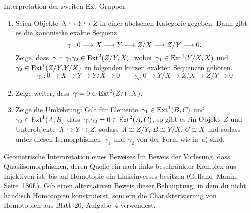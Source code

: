 \documentclass{uebblatt}
\begin{document}
\begin{aufgabe}{Interpretation der zweiten Ext-Gruppen}
\begin{enumerate}
\item Seien Objekte~$X \hookrightarrow Y \hookrightarrow Z$ in einer abelschen
Kategorie gegeben. Dann gibt es die kanonische exakte Sequenz
\[ \gamma : 0 \longrightarrow X \longrightarrow Y \longrightarrow Z/X \longrightarrow Z/Y \longrightarrow 0. \]
Zeige, dass~$\gamma = \gamma_1 \gamma_2 \in \mathrm{Ext}^2(Z/Y,X)$, wobei~$\gamma_1 \in
\mathrm{Ext}^1(Y/X,X)$ und $\gamma_2 \in \mathrm{Ext}^1(Z/Y,Y/X)$ zu folgenden kurzen exakten
Sequenzen gehören.
\[ \gamma_1 : 0 \to X \to Y \to Y/X \to 0 \qquad
  \gamma_2 : 0 \to Y/X \to Z/X \to Z/Y \to 0 \]
\item Zeige weiter, dass~$\gamma = 0 \in \mathrm{Ext}^2(Z/Y,X)$.
\item Zeige die Umkehrung: Gilt für Elemente~$\gamma_1 \in \mathrm{Ext}^1(B,C)$ und
$\gamma_2 \in \mathrm{Ext}^1(A,B)$ dass~$\gamma_1 \gamma_2 = 0 \in \mathrm{Ext}^2(A,C)$, so
gibt es ein Objekt~$Z$ und Unterobjekte~$X \hookrightarrow Y \hookrightarrow
Z$, sodass~$A \cong Z/Y$, $B \cong Y/X$, $C \cong X$ und sodass unter diesen
Isomorphismen~$\gamma_1$ und~$\gamma_2$ von der Form wie in~a) sind.
\end{enumerate}
\end{aufgabe}

\newpage

\begin{aufgabe}{Geometrische Interpretation eines Beweises}
Im Beweis der Vorlesung, dass Quasiisomorphismen, deren Quelle ein nach links
beschränkter Komplex aus Injektiven ist, bis auf Homotopie ein Linksinverses
besitzen (Gelfand--Manin, Seite~180f.). Gib einen alternativen Beweis dieser
Behauptung, in dem du nicht händisch Homotopien konstruierst, sondern die
Charakterisierung von Homotopien aus Blatt~20, Aufgabe~4 verwendest.
\end{aufgabe}
\end{document}
